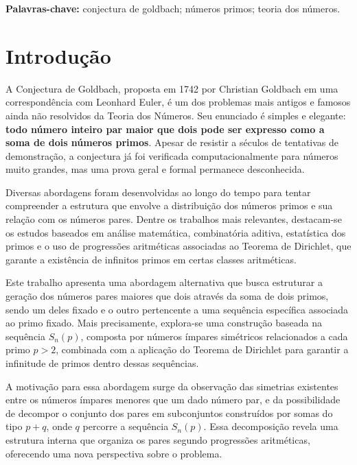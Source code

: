 \documentclass[a4paper,11pt]{article}
\theoremstyle{definition}
\theoremstyle{remark}
\begin{document}
	\textbf{Palavras-chave:} conjectura de goldbach; números primos; teoria dos números.
	
	
	\begin{otherlanguage}{brazil}
	\section{Introdução}

	A Conjectura de Goldbach, proposta em 1742 por Christian Goldbach em uma correspondência com Leonhard Euler, é um dos problemas mais antigos e famosos ainda não resolvidos da Teoria dos Números. Seu enunciado é simples e elegante: \textbf{todo número inteiro par maior que dois pode ser expresso como a soma de dois números primos}. Apesar de resistir a séculos de tentativas de demonstração, a conjectura já foi verificada computacionalmente para números muito grandes, mas uma prova geral e formal permanece desconhecida.
	
	Diversas abordagens foram desenvolvidas ao longo do tempo para tentar compreender a estrutura que envolve a distribuição dos números primos e sua relação com os números pares. Dentre os trabalhos mais relevantes, destacam-se os estudos baseados em análise matemática, combinatória aditiva, estatística dos primos e o uso de progressões aritméticas associadas ao Teorema de Dirichlet, que garante a existência de infinitos primos em certas classes aritméticas.
	
	Este trabalho apresenta uma abordagem alternativa que busca estruturar a geração dos números pares maiores que dois através da soma de dois primos, sendo um deles fixado e o outro pertencente a uma sequência específica associada ao primo fixado. Mais precisamente, explora-se uma construção baseada na sequência \(S_n(p)\), composta por números ímpares simétricos relacionados a cada primo \(p > 2\), combinada com a aplicação do Teorema de Dirichlet para garantir a infinitude de primos dentro dessas sequências.
	
	A motivação para essa abordagem surge da observação das simetrias existentes entre os números ímpares menores que um dado número par, e da possibilidade de decompor o conjunto dos pares em subconjuntos construídos por somas do tipo \(p + q\), onde \(q\) percorre a sequência \(S_n(p)\). Essa decomposição revela uma estrutura interna que organiza os pares segundo progressões aritméticas, oferecendo uma nova perspectiva sobre o problema.
	

\end{otherlanguage}
\end{document}
